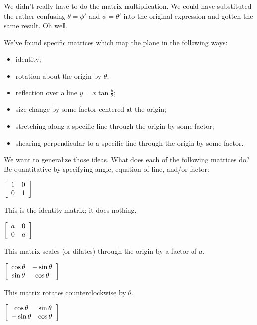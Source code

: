 \documentclass[../key.tex]{subfiles}
\begin{document}
We didn't really have to do the matrix multiplication. We could have substituted the rather confusing $\theta = \phi'$ and $\phi = \theta'$ into the original expression and gotten the same result. Oh well.

\begin{outer_problem}
\item We've found specific matrices which map the plane in the following ways:
\begin{itemize}
\item identity;
\item rotation about the origin by $\theta$;
\item reflection over a line $y=x \tan\frac{\theta}{2}$;
\item size change by some factor centered at the origin;
\item stretching along a specific line through the origin by some factor;
\item shearing perpendicular to a specific line through the origin by some factor.
\end{itemize}
We want to generalize those ideas. What does each of the following matrices do? Be quantitative by specifying angle, equation of line, and/or factor:\label{prob:list_transformations}
\end{outer_problem}

\begin{inner_problem}[start=1]
\item $\left[\begin{array}{cc} 1 & 0 \\ 0 & 1 \end{array}\right]$ \label{prob:list_transformations_part_start}
\end{inner_problem}

This is the identity matrix; it does nothing.

\begin{inner_problem}
\item $\left[\begin{array}{cc} a & 0 \\ 0 & a \end{array}\right]$
\end{inner_problem}

This matrix scales (or dilates) through the origin by a factor of $a$.

\begin{inner_problem}
\item $\left[\begin{array}{cc} \cos\theta & -\sin\theta \\ \sin\theta & \cos\theta \end{array}\right]$
\end{inner_problem}

This matrix rotates counterclockwise by $\theta$.

\begin{inner_problem}
\item $\left[\begin{array}{cc} \cos\theta & \sin\theta \\ -\sin\theta & \cos\theta \end{array}\right]$
\end{inner_problem}
\end{document}
